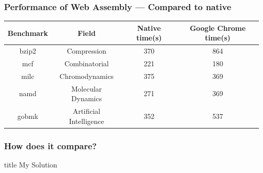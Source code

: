 \documentclass{beamer}
\begin{document}
\begin{frame}
    \frametitle{Performance of Web Assembly — Compared to native}

    {\small
        \begin{table}[H]
            \centering
            \vspace*{6pt}
            \label{native}
            \begin{tabular}{cccc}\hline\hline
                Benchmark & Field                   & Native time(s) & Google Chrome time(s) \\ \hline
                bzip2     & Compression             & 370            & 864                   \\
                mcf       & Combinatorial           & 221            & 180                   \\
                milc      & Chromodynamics          & 375            & 369                   \\
                namd      & Molecular Dynamics      & 271            & 369                   \\
                gobmk     & Artificial Intelligence & 352            & 537
            \end{tabular}
        \end{table}
    }
\end{frame}

\begin{frame}
    \frametitle{How does it compare?}
\end{frame}

\begin{frame}
    \vfill
    \centering
    \begin{beamercolorbox}[sep=8pt,center,shadow=true,rounded=true]{title}
        My Solution\par%
    \end{beamercolorbox}
    \vfill
\end{frame}
\end{document}
